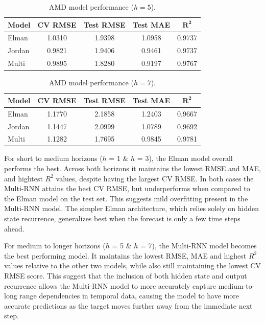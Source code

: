 \documentclass[conference]{IEEEtran}
\begin{document}
\begin{table}[H]
\centering
\caption{AMD model performance ($h=5$).}
\label{tab:amd_h5}
\begin{tabular}{lcccc}
\toprule
\textbf{Model} & \textbf{CV RMSE} & \textbf{Test RMSE} & \textbf{Test MAE} & $\mathbf{R^2}$ \\
\midrule
Elman  & 1.0310 & 1.9398 & 1.0958 & 0.9737 \\
Jordan & 0.9821 & 1.9406 & 0.9461 & 0.9737 \\
Multi  & 0.9895 & 1.8280 & 0.9197 & 0.9767 \\
\bottomrule
\end{tabular}
\end{table}

\begin{table}[H]
\centering
\caption{AMD model performance ($h=7$).}
\label{tab:amd_h7}
\begin{tabular}{lcccc}
\toprule
\textbf{Model} & \textbf{CV RMSE} & \textbf{Test RMSE} & \textbf{Test MAE} & $\mathbf{R^2}$ \\
\midrule
Elman  & 1.1770 & 2.1858 & 1.2403 & 0.9667 \\
Jordan & 1.1447 & 2.0999 & 1.0789 & 0.9692 \\
Multi  & 1.1282 & 1.7695 & 0.9845 & 0.9781 \\
\bottomrule
\end{tabular}
\end{table}

For short to medium horizons ($h$ = 1 \& $h$ = 3), the Elman model overall performs the best. Across both horizons it maintains the lowest RMSE and MAE, and hightest $R^2$ values, despite having the largest CV RMSE. In both cases the Multi-RNN attains the best CV RMSE, but underperforms when compared to the Elman model on the test set. This suggests mild overfitting present in the Multi-RNN model. The simpler Elman architecture, which relies solely on hidden state recurrence, generalizes best when the forecast is only a few time steps ahead.

For medium to longer horizons ($h$ = 5 \& $h$ = 7), the Multi-RNN model becomes the best performing model. It maintains the lowest RMSE, MAE and highest $R^2$ values relative to the other two models, while also still maintaining the lowest CV RMSE score. This suggest that the inclusion of both hidden state and output recurrence allows the Multi-RNN model to more accurately capture medium-to-long range dependencies in temporal data, causing the model to have more accurate predictions as the target moves further away from the immediate next step.
\end{document}
